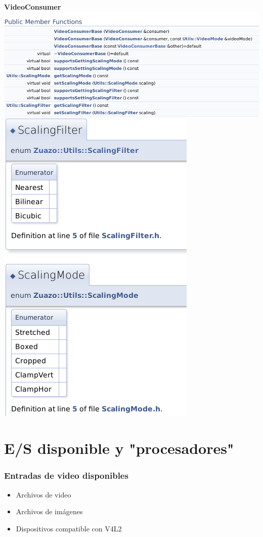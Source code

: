 \documentclass{beamer}
\begin{document}
\begin{frame}[allowframebreaks]
\begin{center}
	\center\large\bf VideoConsumer\\
	\includegraphics[width=\textwidth]{video_consumer} 
	\includegraphics[height=0.8\textheight]{scaling} 
\end{center}
\end{frame}

%
%
\section{E/S disponible y "procesadores"}

\begin{frame}[t] \frametitle{Entradas de video disponibles}
	\begin{itemize}
		\item{Archivos de video} \pause
		\item{Archivos de imágenes} \pause
		\item{Dispositivos compatible con V4L2}
	\end{itemize}
\end{frame}
\end{document}
